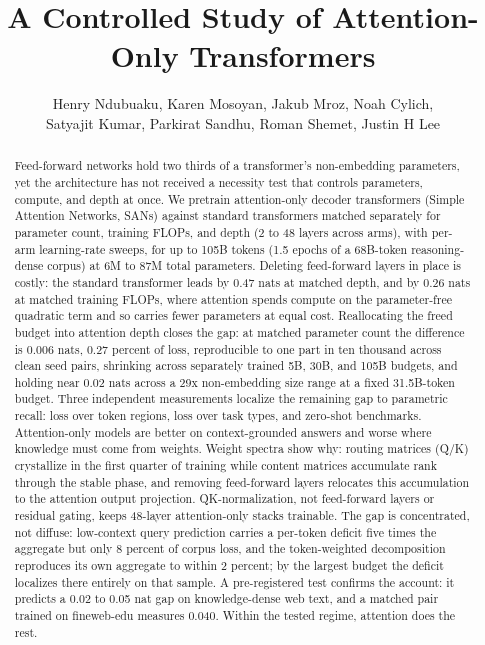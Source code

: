 \documentclass[letterpaper]{article} %
\title{A Controlled Study of Attention-Only Transformers}
\author{
    Henry Ndubuaku, Karen Mosoyan, Jakub Mroz, Noah Cylich,\\
    Satyajit Kumar, Parkirat Sandhu, Roman Shemet, Justin H Lee
}
\begin{document}
\maketitle

\begin{abstract}
Feed-forward networks hold two thirds of a transformer's non-embedding
parameters, yet the architecture has not received a necessity test that
controls parameters, compute, and depth at once. We pretrain attention-only
decoder transformers (Simple Attention Networks, SANs) against standard
transformers matched separately for parameter count, training FLOPs, and
depth (2 to 48 layers across arms), with per-arm learning-rate sweeps, for
up to 105B tokens (1.5 epochs of a 68B-token reasoning-dense corpus) at 6M
to 87M total parameters. Deleting feed-forward layers in place is costly: the
standard transformer leads by 0.47 nats at matched depth, and by 0.26 nats
at matched training FLOPs, where attention spends compute on the
parameter-free quadratic term and so carries fewer parameters at equal
cost. Reallocating the freed budget into attention depth closes the gap:
at matched parameter count the difference is 0.006 nats, 0.27 percent of
loss, reproducible to one part in ten thousand across clean seed pairs,
shrinking across separately trained 5B, 30B, and 105B budgets, and holding
near 0.02 nats across a 29x non-embedding size range at a fixed
31.5B-token budget. Three independent
measurements localize the remaining gap to parametric recall: loss over
token regions, loss over task types, and zero-shot benchmarks.
Attention-only models are better on context-grounded answers and worse
where knowledge must come from weights. Weight spectra show why: routing
matrices (Q/K) crystallize in the first quarter of training while content
matrices accumulate rank through the stable phase, and removing
feed-forward layers relocates this accumulation to the attention output
projection.
QK-normalization, not feed-forward layers or residual gating, keeps
48-layer attention-only stacks trainable. The gap is concentrated, not
diffuse: low-context query prediction carries a per-token deficit five
times the aggregate but only 8 percent of corpus loss, and the
token-weighted decomposition reproduces its own aggregate to within 2
percent; by the largest budget the deficit localizes there entirely on
that sample. A
pre-registered test confirms the account: it predicts a 0.02 to 0.05 nat
gap on knowledge-dense web text, and a matched pair trained on fineweb-edu
measures 0.040. Within the tested regime, attention does the rest.
\end{abstract}
\end{document}

